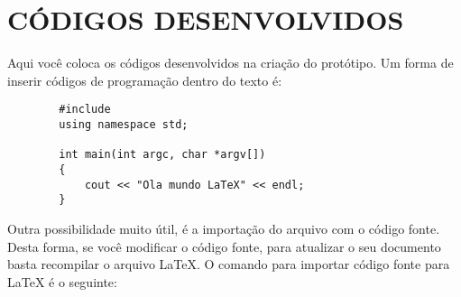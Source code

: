 \documentclass[brazil]{abnt-UVV/abnt-uvv}
\begin{document}


























\anexo



\chapter*{CÓDIGOS DESENVOLVIDOS}

Aqui você coloca os códigos desenvolvidos na criação do protótipo.
Um forma de inserir códigos de programação dentro do texto é:

\begin{lstlisting}
        #include 
        using namespace std;
 
        int main(int argc, char *argv[])
        {
            cout << "Ola mundo LaTeX" << endl;
        }
\end{lstlisting}

Outra possibilidade muito útil, é a importação do arquivo com o código fonte. Desta forma, se você modificar o código fonte, para atualizar o seu documento basta recompilar o arquivo LaTeX. O comando para importar código fonte para LaTeX é o seguinte:




\end{document}
